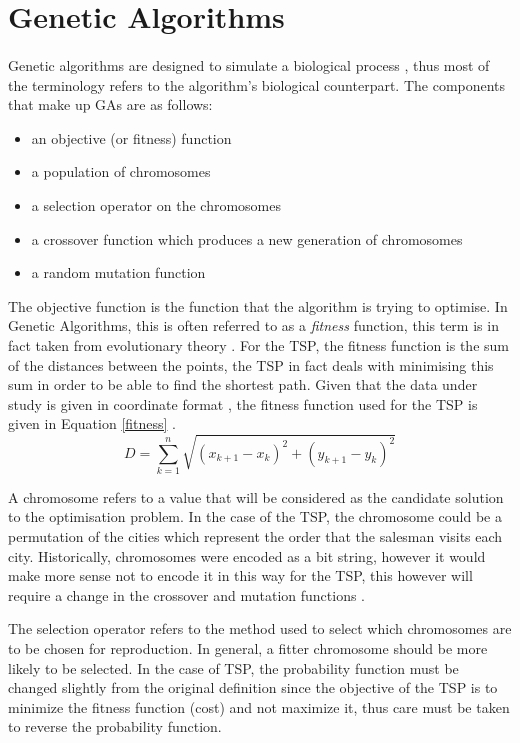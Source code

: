 \documentclass[11pt,a4paper,final]{article}
\begin{document}
	\section{Genetic Algorithms}
	\label{GAs}
	\paragraph{} Genetic algorithms are designed to simulate a biological process \cite{GeneticAlgorithms}, thus most of the terminology refers to the algorithm's biological counterpart. The components that make up GAs are as follows:
	\begin{itemize}
		\item an objective (or fitness) function
		\item a population of chromosomes
		\item a selection operator on the chromosomes
		\item a crossover function which produces a new generation of chromosomes
		\item a random mutation function
	\end{itemize}
	\par The objective function is the function that the algorithm is trying to optimise. In Genetic Algorithms, this is often referred to as a \textit{fitness} function, this term is in fact taken from evolutionary theory \cite{GeneticAlgorithms}. For the TSP, the fitness function is the sum of the distances between the points, the TSP in fact deals with minimising this sum in order to be able to find the shortest path. Given that the data under study is given in coordinate format \cite{data}, the fitness function used for the TSP is given in Equation \ref{fitness} \cite{GeneticAlgorithms}.
	\begin{equation}
	\label{fitness}
	D=\sum_{k=1}^{n}\sqrt{(x_{k+1}-x_k)^2+(y_{k+1}-y_k)^2}
	\end{equation}
	\par A chromosome refers to a value that will be considered as the candidate solution to the optimisation problem. In the case of the TSP, the chromosome could be a permutation of the cities which represent the order that the salesman visits each city. Historically, chromosomes were encoded as a bit string, however it would make more sense not to encode it in this way for the TSP, this however will require a change in the crossover and mutation functions \cite{GeneticAlgorithms}.\\
	\par The selection operator refers to the method used to select which chromosomes are to be chosen for reproduction. In general, a fitter chromosome should be more likely to be selected. In the case of TSP, the probability function must be changed slightly from the original definition since the objective of the TSP is to minimize the fitness function (cost) and not maximize it, thus care must be taken to reverse the probability function. \\
\end{document}
